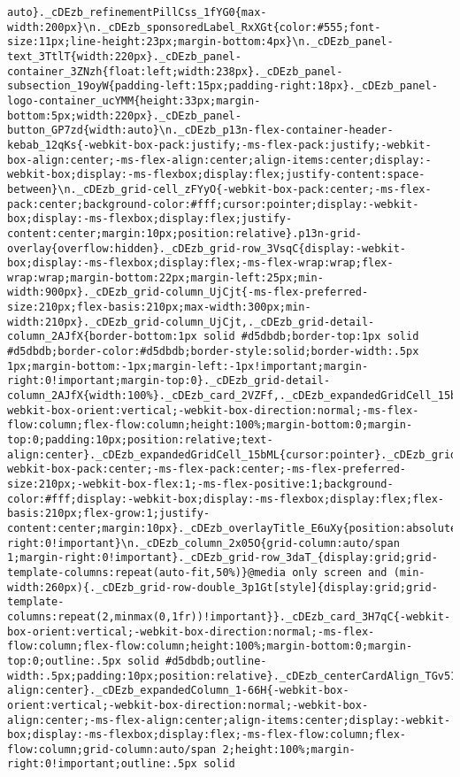 \documentclass[
]{article}
\begin{document}
\begin{verbatim}
auto}._cDEzb_refinementPillCss_1fYG0{max-width:200px}\n._cDEzb_sponsoredLabel_RxXGt{color:#555;font-size:11px;line-height:23px;margin-bottom:4px}\n._cDEzb_panel-text_3TtlT{width:220px}._cDEzb_panel-container_3ZNzh{float:left;width:238px}._cDEzb_panel-subsection_19oyW{padding-left:15px;padding-right:18px}._cDEzb_panel-logo-container_ucYMM{height:33px;margin-bottom:5px;width:220px}._cDEzb_panel-button_GP7zd{width:auto}\n._cDEzb_p13n-flex-container-header-kebab_12qKs{-webkit-box-pack:justify;-ms-flex-pack:justify;-webkit-box-align:center;-ms-flex-align:center;align-items:center;display:-webkit-box;display:-ms-flexbox;display:flex;justify-content:space-between}\n._cDEzb_grid-cell_zFYyO{-webkit-box-pack:center;-ms-flex-pack:center;background-color:#fff;cursor:pointer;display:-webkit-box;display:-ms-flexbox;display:flex;justify-content:center;margin:10px;position:relative}.p13n-grid-overlay{overflow:hidden}._cDEzb_grid-row_3VsqC{display:-webkit-box;display:-ms-flexbox;display:flex;-ms-flex-wrap:wrap;flex-wrap:wrap;margin-bottom:22px;margin-left:25px;min-width:900px}._cDEzb_grid-column_UjCjt{-ms-flex-preferred-size:210px;flex-basis:210px;max-width:300px;min-width:210px}._cDEzb_grid-column_UjCjt,._cDEzb_grid-detail-column_2AJfX{border-bottom:1px solid #d5dbdb;border-top:1px solid #d5dbdb;border-color:#d5dbdb;border-style:solid;border-width:.5px 1px;margin-bottom:-1px;margin-left:-1px!important;margin-right:0!important;margin-top:0}._cDEzb_grid-detail-column_2AJfX{width:100%}._cDEzb_card_2VZFf,._cDEzb_expandedGridCell_15bML{-webkit-box-orient:vertical;-webkit-box-direction:normal;-ms-flex-flow:column;flex-flow:column;height:100%;margin-bottom:0;margin-top:0;padding:10px;position:relative;text-align:center}._cDEzb_expandedGridCell_15bML{cursor:pointer}._cDEzb_gridExpansion_2aNlg{-webkit-box-pack:center;-ms-flex-pack:center;-ms-flex-preferred-size:210px;-webkit-box-flex:1;-ms-flex-positive:1;background-color:#fff;display:-webkit-box;display:-ms-flexbox;display:flex;flex-basis:210px;flex-grow:1;justify-content:center;margin:10px}._cDEzb_overlayTitle_E6uXy{position:absolute;top:35%}._cDEzb_notInterestedMessage_2bIn5{position:absolute;top:50%}._cDEzb_image_rSmhM{opacity:.1}._cDEzb_feedbackRow_23bqz{margin-right:0!important}\n._cDEzb_column_2x05O{grid-column:auto/span 1;margin-right:0!important}._cDEzb_grid-row_3daT_{display:grid;grid-template-columns:repeat(auto-fit,50%)}@media only screen and (min-width:260px){._cDEzb_grid-row-double_3p1Gt[style]{display:grid;grid-template-columns:repeat(2,minmax(0,1fr))!important}}._cDEzb_card_3H7qC{-webkit-box-orient:vertical;-webkit-box-direction:normal;-ms-flex-flow:column;flex-flow:column;height:100%;margin-bottom:0;margin-top:0;outline:.5px solid #d5dbdb;outline-width:.5px;padding:10px;position:relative}._cDEzb_centerCardAlign_TGv51{text-align:center}._cDEzb_expandedColumn_1-66H{-webkit-box-orient:vertical;-webkit-box-direction:normal;-webkit-box-align:center;-ms-flex-align:center;align-items:center;display:-webkit-box;display:-ms-flexbox;display:flex;-ms-flex-flow:column;flex-flow:column;grid-column:auto/span 2;height:100%;margin-right:0!important;outline:.5px solid 
\end{verbatim}
\end{document}
